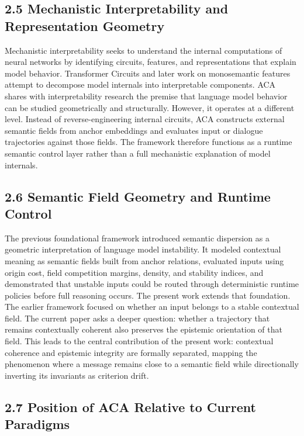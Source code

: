 \documentclass[11pt]{article}
\begin{document}
\subsection{2.5 Mechanistic Interpretability and Representation Geometry}

Mechanistic interpretability seeks to understand the internal computations of neural networks by identifying circuits, features, and representations that explain model behavior. Transformer Circuits and later work on monosemantic features attempt to decompose model internals into interpretable components. ACA shares with interpretability research the premise that language model behavior can be studied geometrically and structurally. However, it operates at a different level. Instead of reverse-engineering internal circuits, ACA constructs external semantic fields from anchor embeddings and evaluates input or dialogue trajectories against those fields. The framework therefore functions as a runtime semantic control layer rather than a full mechanistic explanation of model internals.

\subsection{2.6 Semantic Field Geometry and Runtime Control}

The previous foundational framework introduced semantic dispersion as a geometric interpretation of language model instability. It modeled contextual meaning as semantic fields built from anchor relations, evaluated inputs using origin cost, field competition margins, density, and stability indices, and demonstrated that unstable inputs could be routed through deterministic runtime policies before full reasoning occurs. The present work extends that foundation. The earlier framework focused on whether an input belongs to a stable contextual field. The current paper asks a deeper question: whether a trajectory that remains contextually coherent also preserves the epistemic orientation of that field. This leads to the central contribution of the present work: contextual coherence and epistemic integrity are formally separated, mapping the phenomenon where a message remains close to a semantic field while directionally inverting its invariants as criterion drift.

\subsection{2.7 Position of ACA Relative to Current Paradigms}
\end{document}
